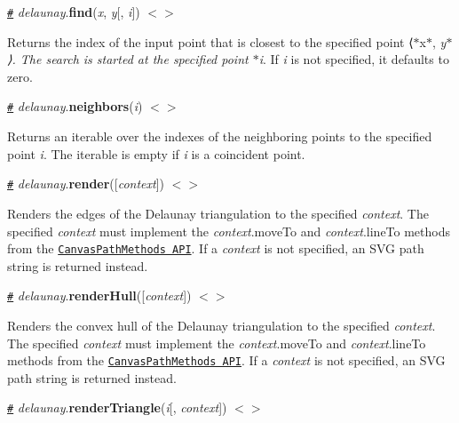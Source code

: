 \href{#delaunay_find}{\tt \#} {\itshape delaunay}.{\bfseries find}({\itshape x}, {\itshape y}\mbox{[}, {\itshape i}\mbox{]}) \href{https://github.com/d3/d3-delaunay/blob/master/src/delaunay.js}{\tt $<$$>$}

Returns the index of the input point that is closest to the specified point ⟨$\ast$x$\ast$, {\itshape y$\ast$⟩. The search is started at the specified point $\ast$i}. If {\itshape i} is not specified, it defaults to zero.

\href{#delaunay_neighbors}{\tt \#} {\itshape delaunay}.{\bfseries neighbors}({\itshape i}) \href{https://github.com/d3/d3-delaunay/blob/master/src/delaunay.js}{\tt $<$$>$}

Returns an iterable over the indexes of the neighboring points to the specified point {\itshape i}. The iterable is empty if {\itshape i} is a coincident point.

\href{#delaunay_render}{\tt \#} {\itshape delaunay}.{\bfseries render}(\mbox{[}{\itshape context}\mbox{]}) \href{https://github.com/d3/d3-delaunay/blob/master/src/delaunay.js}{\tt $<$$>$}



Renders the edges of the Delaunay triangulation to the specified {\itshape context}. The specified {\itshape context} must implement the {\itshape context}.move\+To and {\itshape context}.line\+To methods from the \href{https://www.w3.org/TR/2dcontext/#canvaspathmethods}{\tt Canvas\+Path\+Methods A\+PI}. If a {\itshape context} is not specified, an S\+VG path string is returned instead.

\href{#delaunay_renderHull}{\tt \#} {\itshape delaunay}.{\bfseries render\+Hull}(\mbox{[}{\itshape context}\mbox{]}) \href{https://github.com/d3/d3-delaunay/blob/master/src/delaunay.js}{\tt $<$$>$}



Renders the convex hull of the Delaunay triangulation to the specified {\itshape context}. The specified {\itshape context} must implement the {\itshape context}.move\+To and {\itshape context}.line\+To methods from the \href{https://www.w3.org/TR/2dcontext/#canvaspathmethods}{\tt Canvas\+Path\+Methods A\+PI}. If a {\itshape context} is not specified, an S\+VG path string is returned instead.

\href{#delaunay_renderTriangle}{\tt \#} {\itshape delaunay}.{\bfseries render\+Triangle}({\itshape i}\mbox{[}, {\itshape context}\mbox{]}) \href{https://github.com/d3/d3-delaunay/blob/master/src/delaunay.js}{\tt $<$$>$}




